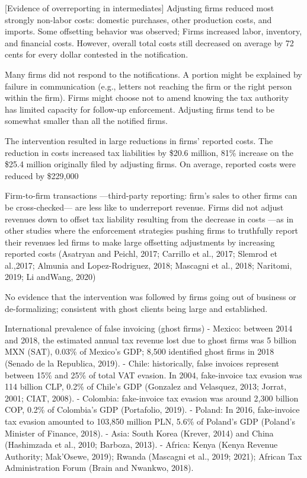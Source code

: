 \documentclass[
  12pt]{article}
\theoremstyle{definition}
\theoremstyle{remark}
\begin{document}
{[}Evidence of overreporting in intermediates{]} Adjusting firms reduced
most strongly non-labor costs: domestic purchases, other production
costs, and imports. Some offsetting behavior was observed; Firms
increased labor, inventory, and financial costs. However, overall total
costs still decreased on average by 72 cents for every dollar contested
in the notification.

Many firms did not respond to the notifications. A portion might be
explained by failure in communication (e.g., letters not reaching the
firm or the right person within the firm). Firms might choose not to
amend knowing the tax authority has limited capacity for follow-up
enforcement. Adjusting firms tend to be somewhat smaller than all the
notified firms.

The intervention resulted in large reductions in firms' reported costs.
The reduction in costs increased tax liabilities by \$20.6 million, 81\%
increase on the \$25.4 million originally filed by adjusting firms. On
average, reported costs were reduced by \$229,000

Firm-to-firm transactions ---third-party reporting: firm's sales to
other firms can be cross-checked--- are less like to underreport
revenue. Firms did not adjust revenues down to offset tax liability
resulting from the decrease in costs ---as in other studies where the
enforcement strategies pushing firms to truthfully report their revenues
led firms to make large offsetting adjustments by increasing reported
costs (Asatryan and Peichl, 2017; Carrillo et al., 2017; Slemrod et
al.,2017; Almunia and Lopez-Rodriguez, 2018; Mascagni et al., 2018;
Naritomi, 2019; Li andWang, 2020)

No evidence that the intervention was followed by firms going out of
business or de-formalizing; consistent with ghost clients being large
and established.

International prevalence of false invoicing (ghost firms) - Mexico:
between 2014 and 2018, the estimated annual tax revenue lost due to
ghost firms was 5 billion MXN (SAT), 0.03\% of Mexico's GDP; 8,500
identified ghost firms in 2018 (Senado de la Republica, 2019). - Chile:
historically, false invoices represent between 15\% and 25\% of total
VAT evasion. In 2004, fake-invoice tax evasion was 114 billion CLP,
0.2\% of Chile's GDP (Gonzalez and Velasquez, 2013; Jorrat, 2001; CIAT,
2008). - Colombia: fake-invoice tax evasion was around 2,300 billion
COP, 0.2\% of Colombia's GDP (Portafolio, 2019). - Poland: In 2016,
fake-invoice tax evasion amounted to 103,850 million PLN, 5.6\% of
Poland's GDP (Poland's Minister of Finance, 2018). - Asia: South Korea
(Krever, 2014) and China (Hashimzada et al., 2010; Barboza, 2013). -
Africa: Kenya (Kenya Revenue Authority; Mak'Osewe, 2019); Rwanda
(Mascagni et al., 2019; 2021); African Tax Administration Forum (Brain
and Nwankwo, 2018).
\end{document}
